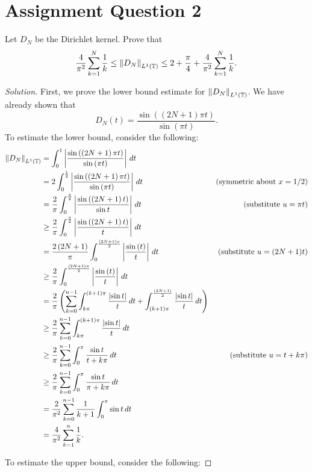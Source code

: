 \section{Assignment Question 2}
\horz
Let $D_{N}$ be the Dirichlet kernel. Prove that
\begin{equation*}
\frac{4}{\pi^{2}} \sum_{k=1}^{N} \frac{1}{k} \le \left\lVert D_{N} \right\rVert_{L^{1} (\mathbb T)} \le 2 + \frac{\pi}{4} + \frac{4}{\pi ^{2}} \sum_{k=1}^{N} \frac{1}{k}.
\end{equation*}
\horz

\begin{proof}[Solution]
First, we prove the lower bound estimate for $\left\lVert D_{N} \right\rVert_{L^{1}\left( \mathbb T \right)}$. We have already shown that
\begin{equation*}
D_{N} \left( t \right) = \frac{\sin \left(\left( 2N+1 \right)\pi t\right)}{\sin \left( \pi t \right)}.
\end{equation*}
To estimate the lower bound, consider the following:
\begin{align*}
\left\lVert D_{N} \right\rVert_{L^{1} \left( \mathbb T \right)} &= \int_{0}^{1} \left\lvert  \frac{\sin \left( \left( 2N+1 \right)\pi t \right)}{\sin \left( \pi t \right)} \right\rvert \, dt \\
&= 2 \int_{0}^{\frac{1}{2}}  \left\lvert  \frac{\sin \left( \left( 2N+1 \right)\pi t \right)}{\sin \left( \pi t \right)} \right\rvert \, dt & \text{(symmetric about } x=1/2 ) \\
&= \frac{2}{\pi} \int_{0}^{\frac{\pi}{2}} \left\lvert \frac{\sin \left( \left( 2N +1 \right)t \right)}{\sin t} \right\rvert \, dt & \text{(substitute } u=\pi t ) \\
& \ge   \frac{2}{\pi} \int_{0}^{\frac{\pi}{2}} \left\lvert \frac{\sin \left( \left( 2N +1 \right)t \right)}{t} \right\rvert \, dt  \\
& =   \frac{2\left( 2N+1 \right)}{\pi} \int_{0}^{\frac{(2N+1)\pi}{2}} \left\lvert \frac{\sin \left( t \right)}{t} \right\rvert \, dt   & \left(\text{substitute }u=( 2N+1 )t \right)  \\
&\ge \frac{2}{\pi} \int_{0}^{\frac{(2N+1)\pi}{2}} \left\lvert \frac{\sin \left( t \right)}{t} \right\rvert \, dt   \\
&= \frac{2}{\pi} \left( \sum_{k=0}^{n-1} \int_{k\pi}^{\left( k+1 \right)\pi} \frac{\left\lvert \sin t \right\rvert}{t} \, dt + \int_{(k+1)\pi}^{\frac{\left( 2N+1 \right)}{2}} \frac{\left\lvert \sin t \right\rvert}{t} \, dt \right) \\
&\ge \frac{2}{\pi} \sum_{k=0}^{n-1} \int_{k\pi}^{\left( k+1 \right)\pi} \frac{\left\lvert \sin t \right\rvert}{t} \, dt  \\
&\ge\frac{2}{\pi} \sum_{k=0}^{n-1} \int_{0}^{\pi} \frac{\sin t}{ t+k\pi} \, dt & \left( \text{substitute } u=t+k\pi \right) \\
&\ge\frac{2}{\pi} \sum_{k=0}^{n-1} \int_{0}^{\pi} \frac{\sin t}{ \pi+k\pi} \, dt  \\
&= \frac{2}{\pi ^{2}} \sum_{k=0}^{n-1} \frac{1}{k+1} \int_{0}^{\pi} \sin t \, dt \\
&= \frac{4}{\pi ^{2}} \sum_{k=1}^{n} \frac{1}{k}.
\end{align*}

To estimate the upper bound, consider the following:
\end{proof}
